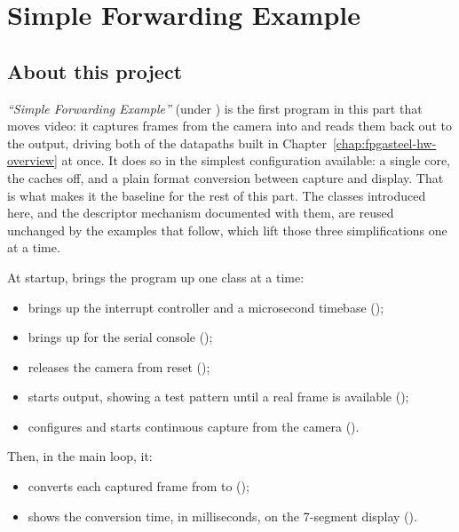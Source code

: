 \chapter{Simple Forwarding Example}
\label{chap:fpgasteel-simple-forwarding}

\section{About this project}
\label{sec:fpgasteel-simple-forwarding-about}

\textit{``Simple Forwarding Example''} (under ) is the first program in this part that moves video: it captures frames from the  camera into  and reads them back out to the  output, driving both of the datapaths built in Chapter~\ref{chap:fpgasteel-hw-overview} at once. It does so in the simplest configuration available: a single core, the  caches off, and a plain format conversion between capture and display. That is what makes it the baseline for the rest of this part. The classes introduced here, and the descriptor mechanism documented with them, are reused unchanged by the examples that follow, which lift those three simplifications one at a time.

At startup,  brings the program up one class at a time:

\begin{itemize}
    \item brings up the interrupt controller and a microsecond timebase ();
    \item brings up  for the serial console ();
    \item releases the camera from reset ();
    \item starts  output, showing a test pattern until a real frame is available ();
    \item configures and starts continuous  capture from the camera ().
\end{itemize}

Then, in the main loop, it:

\begin{itemize}
    \item converts each captured frame from  to  ();
    \item shows the conversion time, in milliseconds, on the 7-segment display ().
\end{itemize}

